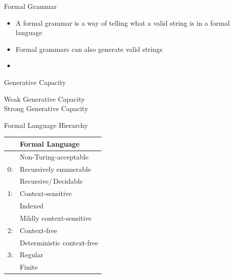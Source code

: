 \documentclass{beamer}
\begin{document}
\begin{frame}{Formal Grammar}
\begin{block}{}
\begin{itemize}
	\item A formal grammar is a way of telling what a valid string is in a formal language
	\item Formal grammars can also generate valid strings
	\item 
\end{itemize}
\end{block}
\end{frame}


\begin{frame}{Generative Capacity}
\begin{block}{}
\begin{description}
	\item[Weak Generative Capacity]
	\item[Strong Generative Capacity] 
\end{description}
\end{block}
\end{frame}


\begin{frame}{Formal Language Hierarchy}
\begin{center}
\begin{tabular}{|ll|}
\hline
& Formal Language \\
\hline
\hline
& Non-Turing-acceptable\\
\hline
0: & Recursively enumerable \\
\hline
& Recursive/\,Decidable \\
\hline
1: & Context-sensitive \\
\hline
& Indexed \\
\hline
& Mildly context-sensitive \\
\hline
2: & Context-free \\
\hline
& Deterministic context-free \\
\hline
3: & Regular \\
\hline
& Finite \\
\hline
\end{tabular}
\end{center}
\end{frame}
\end{document}
